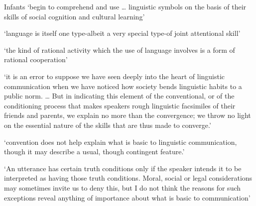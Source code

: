 \documentclass[12pt]{extarticle}
\begin{document}
\begin{multicols}{3}
Infants ‘begin to comprehend and use … linguistic symbols on the basis of their skills of social cognition and cultural learning’
\citep[p.\ 582]{Tomasello:1999en}
 
‘language is itself one type-albeit a very special type-of joint attentional skill’
\citep[p.\ 1120]{Tomasello:2001ic}
 
‘the kind of rational activity which the use of language involves is a form of rational cooperation’
\citep[p.\ 341]{Grice:1989ha}
 
‘it is an error to suppose we have seen deeply into the heart of linguistic communication when we have noticed how society bends linguistic habits to a public norm.
… But in indicating this element of the conventional, or of the conditioning process that makes speakers rough linguistic facsimiles of their friends and parents, we explain no more than the convergence; we throw no light on the essential nature of the skills that are thus made to converge.’
\citep[p.\ 278]{Davidson:1982uu}
 
‘convention does not help explain what is basic to linguistic communication, though it may describe a usual, though contingent feature.’
\citep[p.\ 280]{Davidson:1982uu}
 
‘An utterance has certain truth conditions only if the speaker intends it to be interpreted as having those truth conditions.
Moral, social or legal considerations may sometimes invite us to deny this, but I do not think the reasons for such exceptions reveal anything of importance about what is basic to communication’
\citep[p.\ 310]{Davidson:1990du}
  
 
\footnotesize 


\end{multicols}
\end{document}
